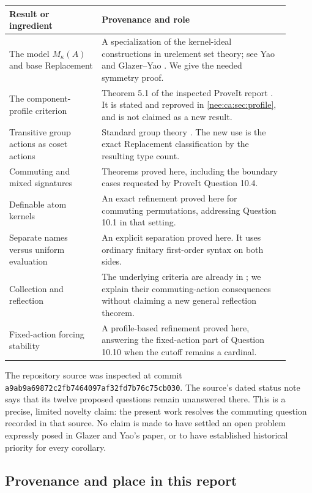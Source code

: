\documentclass[11pt,letterpaper]{article}
\numberwithin{equation}{section}
\theoremstyle{plain}
\theoremstyle{definition}
\theoremstyle{remark}
\newcommand{\Mk}{M_\kappa(A)}
\begin{document}
\begin{longtable}{@{}L{0.30\linewidth}L{0.61\linewidth}@{}}
\toprule
Result or ingredient & Provenance and role \\
\midrule
\endhead
The model $\Mk$ and base Replacement & A specialization of the kernel-ideal constructions in urelement set theory; see Yao \cite{Yao2023} and Glazer--Yao \cite{GY2026}. We give the needed symmetry proof. \\[5pt]
The component-profile criterion & Theorem 5.1 of the inspected ProveIt report \cite{RepoNaming}. It is stated and reproved in \cref{nee:ca:sec:profile}, and is not claimed as a new result. \\[5pt]
Transitive group actions as coset actions & Standard group theory \cite{Mitchell2014}. The new use is the exact Replacement classification by the resulting type count. \\[5pt]
Commuting and mixed signatures & Theorems proved here, including the boundary cases requested by ProveIt Question 10.4. \\[5pt]
Definable atom kernels & An exact refinement proved here for commuting permutations, addressing Question 10.1 in that setting. \\[5pt]
Separate names versus uniform evaluation & An explicit separation proved here. It uses ordinary finitary first-order syntax on both sides. \\[5pt]
Collection and reflection & The underlying criteria are already in \cite{RepoNaming}; we explain their commuting-action consequences without claiming a new general reflection theorem. \\[5pt]
Fixed-action forcing stability & A profile-based refinement proved here, answering the fixed-action part of Question 10.10 when the cutoff remains a cardinal. \\
\bottomrule
\end{longtable}

The repository source was inspected at commit
\nolinkurl{a9ab9a69872c2fb7464097af32fd7b76c75cb030}.
The source's dated status note says that its twelve proposed questions remain unanswered there. This is a precise, limited novelty claim: the present work resolves the commuting question recorded in that source. No claim is made to have settled an open problem expressly posed in Glazer and Yao's paper, or to have established historical priority for every corollary.

\subsection{Provenance and place in this report}
\label{nee:ca:sec:provenance}
\end{document}
